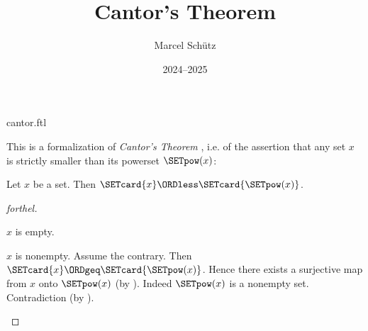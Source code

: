 \documentclass{article}
\title{Cantor's Theorem}
\author{Marcel Schütz}
\date{2024--2025}
\begin{document}
\begin{smodule}{cantor.ftl}
\maketitle


\noindent This is a formalization of \emph{Cantor's Theorem}
\cite{Cantor1891}, i.e. of the assertion that any set $x$ is strictly smaller
than its powerset $\SETpow(x)$:

\begin{theorem}[forthel,title=Cantor's Theorem,id=cantor_389275382172394]
  Let $x$ be a set.
  Then $\SETcard{x} \ORDless \SETcard{\SETpow(x)}$.
\end{theorem}
\begin{proof}[forthel]
  \begin{case}{$x$ is empty.} \end{case}

  \begin{case}{$x$ is nonempty.}
    Assume the contrary.
    Then $\SETcard{x} \ORDgeq \SETcard{\SETpow(x)}$.
    Hence there exists a surjective map from $x$ onto $\SETpow(x)$ (by ).
    Indeed $\SETpow(x)$ is a nonempty set.
    Contradiction (by ).
  \end{case}
\end{proof}

\printbibliography
{}
\end{smodule}
\end{document}
